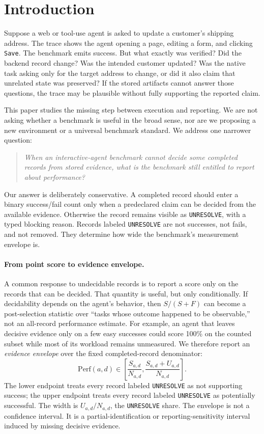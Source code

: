 \documentclass{article}
\begin{document}
\section{Introduction}

Suppose a web or tool-use agent is asked to update a customer's shipping
address. The trace shows the agent opening a page, editing a form, and clicking
\texttt{Save}. The benchmark emits success. But what exactly was verified? Did
the backend record change? Was the intended customer updated? Was the native
task asking only for the target address to change, or did it also claim that
unrelated state was preserved? If the stored artifacts cannot answer those
questions, the trace may be plausible without fully supporting the reported
claim.

This paper studies the missing step between execution and reporting. We are not
asking whether a benchmark is useful in the broad sense, nor are we proposing a
new environment or a universal benchmark standard. We address one narrower
question:

\begin{quote}\itshape
When an interactive-agent benchmark cannot decide some completed records from
stored evidence, what is the benchmark still entitled to report about
performance?
\end{quote}

Our answer is deliberately conservative. A completed record should enter a
binary success/fail count only when a predeclared claim can be decided from the
available evidence. Otherwise the record remains visible as \texttt{UNRESOLVE},
with a typed blocking reason. Records labeled \texttt{UNRESOLVE} are not
successes, not fails, and not removed. They determine how wide the benchmark's
measurement envelope is.

\paragraph{From point score to evidence envelope.}
A common response to undecidable records is to report a score only on the
records that can be decided. That quantity is useful, but only conditionally.
If decidability depends on the agent's behavior, then \(S/(S+F)\) can become a
post-selection statistic over ``tasks whose outcome happened to be observable,''
not an all-record performance estimate. For example, an agent that leaves
decisive evidence only on a few easy successes could score 100\% on the counted
subset while most of its workload remains unmeasured. We therefore report an
\emph{evidence envelope} over the fixed completed-record denominator:
\[
  \mathrm{Perf}(a,d) \in
  \left[
    \frac{S_{a,d}}{N_{a,d}},
    \frac{S_{a,d}+U_{a,d}}{N_{a,d}}
  \right].
\]
The lower endpoint treats every record labeled \texttt{UNRESOLVE} as not
supporting success; the upper endpoint treats every record labeled
\texttt{UNRESOLVE} as potentially successful. The width is \(U_{a,d}/N_{a,d}\),
the \texttt{UNRESOLVE} share. The envelope is not a confidence interval. It is
a partial-identification or reporting-sensitivity interval induced by missing
decisive evidence.
\end{document}
